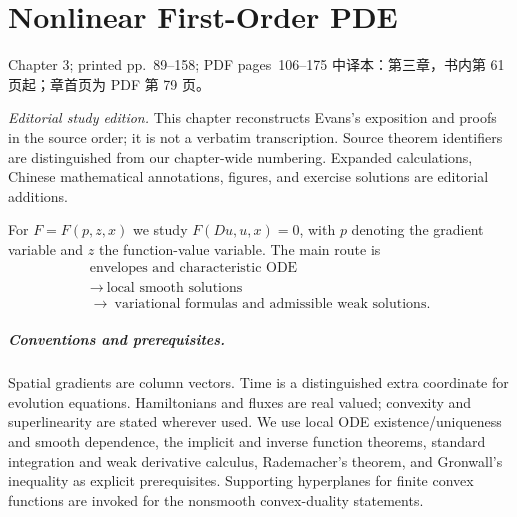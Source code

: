 \chapter{Nonlinear First-Order PDE}
\label{chap:nonlinear-first-order-pde}

\PDESource
  {Chapter 3; printed pp.~89--158; PDF pages~106--175}
  {中译本：第三章，书内第 61 页起；章首页为 PDF 第 79 页。}

\noindent\textit{Editorial study edition.}
This chapter reconstructs Evans's exposition and proofs in the source
order; it is not a verbatim transcription. Source theorem identifiers
are distinguished from our chapter-wide numbering. Expanded calculations,
Chinese mathematical annotations, figures, and exercise solutions are
editorial additions.

For $F=F(p,z,x)$ we study $F(Du,u,x)=0$, with $p$ denoting the gradient
variable and $z$ the function-value variable. The main route is
\[
 \begin{gathered}
 \text{envelopes and characteristic ODE}\\
 \longrightarrow\ \text{local smooth solutions}\\
 \longrightarrow\ \text{variational formulas and admissible weak solutions}.
 \end{gathered}
\]
\Needspace{45mm}
\paragraph{Conventions and prerequisites.}
Spatial gradients are column vectors. Time is a distinguished extra
coordinate for evolution equations. Hamiltonians and fluxes are real
valued; convexity and superlinearity are stated wherever used.
We use local ODE existence/uniqueness and smooth dependence, the implicit
and inverse function theorems, standard integration and weak derivative
calculus, Rademacher's theorem, and Gronwall's inequality as explicit
prerequisites. Supporting hyperplanes for finite convex functions are
invoked for the nonsmooth convex-duality statements.

\clearpage







